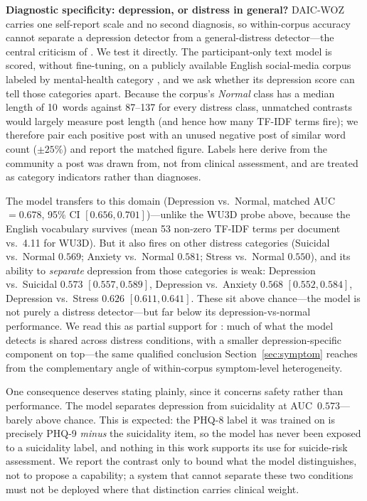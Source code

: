 \documentclass[journal]{IEEEtran}
\begin{document}
\textbf{Diagnostic specificity: depression, or distress in general?}
DAIC-WOZ carries one self-report scale and no second diagnosis, so
within-corpus accuracy cannot separate a depression detector from a
general-distress detector---the central criticism of
\cite{patapati2025invalid}. We test it directly. The participant-only
text model is scored, without fine-tuning, on a publicly available
English social-media corpus labeled by mental-health category
\cite{sarkar2022mentalhealth}, and we ask whether its
depression score can tell those categories apart. Because the corpus's
\emph{Normal} class has a median length of 10~words against 87--137 for
every distress class, unmatched contrasts would largely measure post
length (and hence how many TF-IDF terms fire); we therefore pair each
positive post with an unused negative post of similar word count
($\pm25\%$) and report the matched figure. Labels here derive from the
community a post was drawn from, not from clinical assessment, and are
treated as category indicators rather than diagnoses.

The model transfers to this domain (Depression vs.\ Normal, matched
AUC~$=0.678$, 95\% CI $[0.656, 0.701]$)---unlike the WU3D probe above,
because the English vocabulary survives (mean 53 non-zero TF-IDF terms
per document vs.\ 4.11 for WU3D). But it also fires on other distress
categories (Suicidal vs.\ Normal $0.569$; Anxiety vs.\ Normal $0.581$;
Stress vs.\ Normal $0.550$), and its ability to \emph{separate}
depression from those categories is weak: Depression vs.\ Suicidal
$0.573$ $[0.557, 0.589]$, Depression vs.\ Anxiety $0.568$
$[0.552, 0.584]$, Depression vs.\ Stress $0.626$ $[0.611, 0.641]$.
These sit above chance---the model is not purely a distress
detector---but far below its depression-vs-normal performance. We read
this as partial support for \cite{patapati2025invalid}: much of what the
model detects is shared across distress conditions, with a smaller
depression-specific component on top---the same qualified conclusion
Section~\ref{sec:symptom} reaches from the complementary angle of
within-corpus symptom-level heterogeneity.

One consequence deserves stating plainly, since it concerns safety
rather than performance. The model separates depression from
suicidality at AUC~$0.573$---barely above chance. This is expected: the
PHQ-8 label it was trained on is precisely PHQ-9 \emph{minus} the
suicidality item, so the model has never been exposed to a suicidality
label, and nothing in this work supports its use for suicide-risk
assessment. We report the contrast only to bound what the model
distinguishes, not to propose a capability; a system that cannot
separate these two conditions must not be deployed where that
distinction carries clinical weight.
\end{document}
